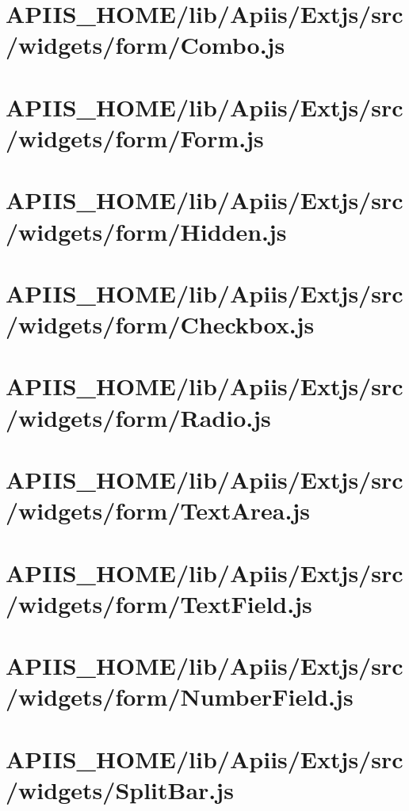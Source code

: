 \section{APIIS\_HOME/lib/Apiis/Extjs/src/widgets/form/Combo.js} 
\section{APIIS\_HOME/lib/Apiis/Extjs/src/widgets/form/Form.js} 
\section{APIIS\_HOME/lib/Apiis/Extjs/src/widgets/form/Hidden.js} 
\section{APIIS\_HOME/lib/Apiis/Extjs/src/widgets/form/Checkbox.js} 
\section{APIIS\_HOME/lib/Apiis/Extjs/src/widgets/form/Radio.js} 
\section{APIIS\_HOME/lib/Apiis/Extjs/src/widgets/form/TextArea.js} 
\section{APIIS\_HOME/lib/Apiis/Extjs/src/widgets/form/TextField.js} 
\section{APIIS\_HOME/lib/Apiis/Extjs/src/widgets/form/NumberField.js} 
\section{APIIS\_HOME/lib/Apiis/Extjs/src/widgets/SplitBar.js} 
